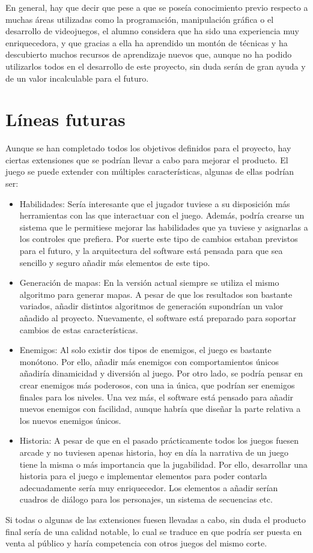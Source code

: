 	En general, hay que decir que pese a que se poseía conocimiento previo respecto a muchas áreas utilizadas como la programación, manipulación gráfica o el desarrollo de videojuegos, el alumno considera que ha sido una experiencia muy enriquecedora, y que gracias a ella ha aprendido un montón de técnicas y ha descubierto muchos recursos de aprendizaje nuevos que, aunque no ha podido utilizarlos todos en el desarrollo de este proyecto, sin duda serán de gran ayuda y de un valor incalculable para el futuro.

\section{Líneas futuras}

	Aunque se han completado todos los objetivos definidos para el proyecto, hay ciertas extensiones que se podrían llevar a cabo para mejorar el producto. El juego se puede extender con múltiples características, algunas de ellas podrían ser:

	\begin{itemize}

		\item Habilidades: Sería interesante que el jugador tuviese a su disposición más herramientas con las que interactuar con el juego. Además, podría crearse un sistema que le permitiese mejorar las habilidades que ya tuviese y asignarlas a los controles que prefiera. Por suerte este tipo de cambios estaban previstos para el futuro, y la arquitectura del software está pensada para que sea sencillo y seguro añadir más elementos de este tipo.

		\item Generación de mapas: En la versión actual siempre se utiliza el mismo algoritmo para generar mapas. A pesar de que los resultados son bastante variados, añadir distintos algoritmos de generación supondrían un valor añadido al proyecto. Nuevamente, el software está preparado para soportar cambios de estas características.

		\item Enemigos: Al solo existir dos tipos de enemigos, el juego es bastante monótono. Por ello, añadir más enemigos con comportamientos únicos añadiría dinamicidad y diversión al juego. Por otro lado, se podría pensar en crear enemigos más poderosos, con una \acrshort{ia} única, que podrían ser enemigos finales para los niveles. Una vez más, el software está pensado para añadir nuevos enemigos con facilidad, aunque habría que diseñar la parte relativa a los nuevos enemigos únicos.

		\item Historia: A pesar de que en el pasado prácticamente todos los juegos fuesen arcade y no tuviesen apenas historia, hoy en día la narrativa de un juego tiene la misma o más importancia que la jugabilidad. Por ello, desarrollar una historia para el juego e implementar elementos para poder contarla adecuadamente sería muy enriquecedor. Los elementos a añadir serían cuadros de diálogo para los personajes, un sistema de secuencias etc.

	\end{itemize}

	Si todas o algunas de las extensiones fuesen llevadas a cabo, sin duda el producto final sería de una calidad notable, lo cual se traduce en que podría ser puesta en venta al público y haría competencia con otros juegos del mismo corte.
	